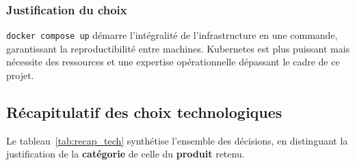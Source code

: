 \subsubsection*{Justification du choix}

\texttt{docker compose up} démarre l'intégralité de l'infrastructure en une commande, garantissant la reproductibilité entre machines. Kubernetes est plus puissant mais nécessite des ressources et une expertise opérationnelle dépassant le cadre de ce projet.

\subsection{Récapitulatif des choix technologiques}

Le tableau~\ref{tab:recap_tech} synthétise l'ensemble des décisions, en distinguant
la justification de la \textbf{catégorie} de celle du \textbf{produit} retenu.

